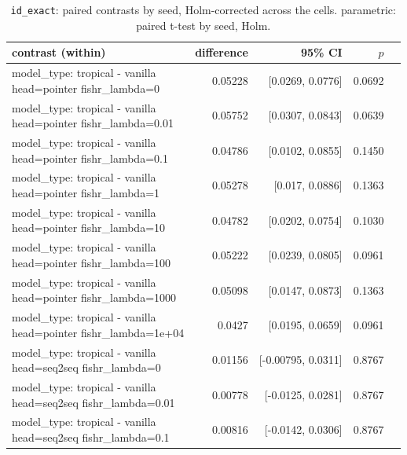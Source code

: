 \documentclass[10pt]{article}
\makeatletter
\newcommand{\stackcell}[1]{\begin{tabular}[t]{@{}l@{}}#1\end{tabular}}
\makeatother
\begin{document}
{\small
\begin{longtable}{lrrrl}
\caption{\texttt{id\_exact}: paired contrasts by seed, Holm-corrected across the cells. parametric: paired t-test by seed, Holm.}\label{tab:paired-id_exact}\\
\toprule
contrast (within) & difference & 95\% CI & $p$ & \\
\midrule
\endhead
\stackcell{model\_type: tropical - vanilla\\\footnotesize head=pointer fishr\_lambda=0 } & 0.05228 & [0.0269, 0.0776] & 0.0692 & \\
\stackcell{model\_type: tropical - vanilla\\\footnotesize head=pointer fishr\_lambda=0.01 } & 0.05752 & [0.0307, 0.0843] & 0.0639 & \\
\stackcell{model\_type: tropical - vanilla\\\footnotesize head=pointer fishr\_lambda=0.1 } & 0.04786 & [0.0102, 0.0855] & 0.1450 & \\
\stackcell{model\_type: tropical - vanilla\\\footnotesize head=pointer fishr\_lambda=1 } & 0.05278 & [0.017, 0.0886] & 0.1363 & \\
\stackcell{model\_type: tropical - vanilla\\\footnotesize head=pointer fishr\_lambda=10 } & 0.04782 & [0.0202, 0.0754] & 0.1030 & \\
\stackcell{model\_type: tropical - vanilla\\\footnotesize head=pointer fishr\_lambda=100 } & 0.05222 & [0.0239, 0.0805] & 0.0961 & \\
\stackcell{model\_type: tropical - vanilla\\\footnotesize head=pointer fishr\_lambda=1000 } & 0.05098 & [0.0147, 0.0873] & 0.1363 & \\
\stackcell{model\_type: tropical - vanilla\\\footnotesize head=pointer fishr\_lambda=1e+04 } & 0.0427 & [0.0195, 0.0659] & 0.0961 & \\
\stackcell{model\_type: tropical - vanilla\\\footnotesize head=seq2seq fishr\_lambda=0 } & 0.01156 & [-0.00795, 0.0311] & 0.8767 & \\
\stackcell{model\_type: tropical - vanilla\\\footnotesize head=seq2seq fishr\_lambda=0.01 } & 0.00778 & [-0.0125, 0.0281] & 0.8767 & \\
\stackcell{model\_type: tropical - vanilla\\\footnotesize head=seq2seq fishr\_lambda=0.1 } & 0.00816 & [-0.0142, 0.0306] & 0.8767 & \\

\end{longtable}}
\end{document}
